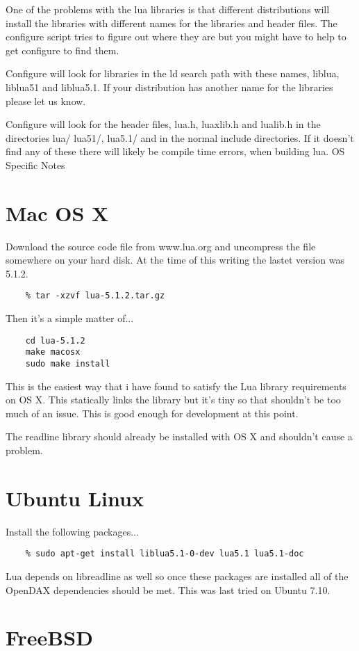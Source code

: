 \documentclass[letterpaper,10pt]{report}
\begin{document}
One of the problems with the lua libraries is that different distributions will install the libraries with different names for the libraries and header files. The configure script tries to figure out where they are but you might have to help to get configure to find them.

Configure will look for libraries in the ld search path with these names, liblua, liblua51 and liblua5.1. If your distribution has another name for the libraries please let us know.

Configure will look for the header files, lua.h, luaxlib.h and lualib.h in the directories lua/ lua51/, lua5.1/ and in the normal include directories. If it doesn't find any of these there will likely be compile time errors, when building lua.
OS Specific Notes
\section*{Mac OS X}
Download the source code file from www.lua.org and uncompress the file somewhere on your hard disk. At the time of this writing the lastet version was 5.1.2.
\begin{verbatim}
    % tar -xzvf lua-5.1.2.tar.gz
\end{verbatim}

Then it's a simple matter of...
\begin{verbatim}
    cd lua-5.1.2
    make macosx
    sudo make install
\end{verbatim}

This is the easiest way that i have found to satisfy the Lua library requirements on OS X. This statically links the library but it's tiny so that shouldn't be too much of an issue. This is good enough for development at this point.

The readline library should already be installed with OS X and shouldn't cause a problem.
\section*{Ubuntu Linux}

Install the following packages...
\begin{verbatim}
    % sudo apt-get install liblua5.1-0-dev lua5.1 lua5.1-doc
\end{verbatim}
Lua depends on libreadline as well so once these packages are installed all of the OpenDAX dependencies should be met. This was last tried on Ubuntu 7.10.
\section*{FreeBSD}
\end{document}
